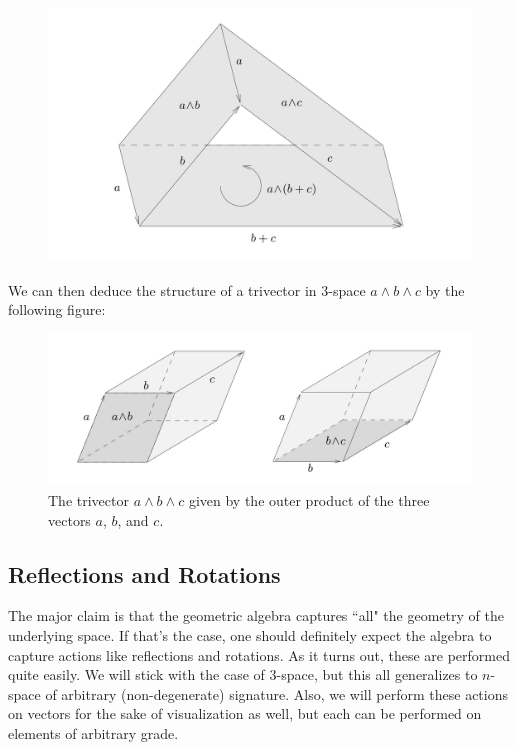 \begin{figure}[H]
    \centering
    \includegraphics[width=\textwidth]{geometric_algebra_calculus/figures/linearity_out_prod.png}
    \caption{}
    \label{fig:bivector_linearity}
\end{figure}
We can then deduce the structure of a trivector in 3-space $a\wedge b \wedge c$ by the following figure:
\begin{figure}[H]
    \centering
    \includegraphics[width=\textwidth]{geometric_algebra_calculus/figures/trivector.png}
    \caption{The trivector $a\wedge b \wedge c$ given by the outer product of the three vectors $a$, $b$, and $c$.}
    \label{fig:trivector}
\end{figure}



\subsection{Reflections and Rotations}

The major claim is that the geometric algebra captures ``all" the geometry of the underlying space.  If that's the case, one should definitely expect the algebra to capture actions like reflections and rotations. As it turns out, these are performed quite easily. We will stick with the case of 3-space, but this all generalizes to $n$-space of arbitrary (non-degenerate) signature.  Also, we will perform these actions on vectors for the sake of visualization as well, but each can be performed on elements of arbitrary grade.


